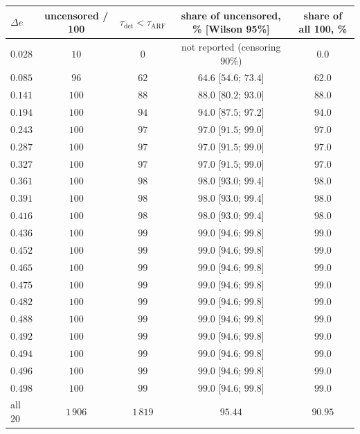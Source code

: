 \documentclass[11pt,a4paper]{article}
\begin{document}
\begin{table}[htbp]
  \centering
  \small
  \begin{tabular}{lcccc}
    \toprule
    $\Delta e$ & uncensored / 100 & $\tau_{\mathrm{det}} < \tau_{\mathrm{ARF}}$ & share of uncensored, \% [Wilson 95\%] & share of all 100, \% \\
    \midrule
    $0.028$ & $10$  & $0$  & not reported (censoring $90\%$) & $0.0$ \\
    $0.085$ & $96$  & $62$ & $64.6$ [$54.6$; $73.4$] & $62.0$ \\
    $0.141$ & $100$ & $88$ & $88.0$ [$80.2$; $93.0$] & $88.0$ \\
    $0.194$ & $100$ & $94$ & $94.0$ [$87.5$; $97.2$] & $94.0$ \\
    $0.243$ & $100$ & $97$ & $97.0$ [$91.5$; $99.0$] & $97.0$ \\
    $0.287$ & $100$ & $97$ & $97.0$ [$91.5$; $99.0$] & $97.0$ \\
    $0.327$ & $100$ & $97$ & $97.0$ [$91.5$; $99.0$] & $97.0$ \\
    $0.361$ & $100$ & $98$ & $98.0$ [$93.0$; $99.4$] & $98.0$ \\
    $0.391$ & $100$ & $98$ & $98.0$ [$93.0$; $99.4$] & $98.0$ \\
    $0.416$ & $100$ & $98$ & $98.0$ [$93.0$; $99.4$] & $98.0$ \\
    $0.436$ & $100$ & $99$ & $99.0$ [$94.6$; $99.8$] & $99.0$ \\
    $0.452$ & $100$ & $99$ & $99.0$ [$94.6$; $99.8$] & $99.0$ \\
    $0.465$ & $100$ & $99$ & $99.0$ [$94.6$; $99.8$] & $99.0$ \\
    $0.475$ & $100$ & $99$ & $99.0$ [$94.6$; $99.8$] & $99.0$ \\
    $0.482$ & $100$ & $99$ & $99.0$ [$94.6$; $99.8$] & $99.0$ \\
    $0.488$ & $100$ & $99$ & $99.0$ [$94.6$; $99.8$] & $99.0$ \\
    $0.492$ & $100$ & $99$ & $99.0$ [$94.6$; $99.8$] & $99.0$ \\
    $0.494$ & $100$ & $99$ & $99.0$ [$94.6$; $99.8$] & $99.0$ \\
    $0.496$ & $100$ & $99$ & $99.0$ [$94.6$; $99.8$] & $99.0$ \\
    $0.498$ & $100$ & $99$ & $99.0$ [$94.6$; $99.8$] & $99.0$ \\
    \midrule
    all 20  & $1\,906$ & $1\,819$ & $95.44$ & $90.95$ \\
    \bottomrule
  \end{tabular}

\end{table}
\end{document}
